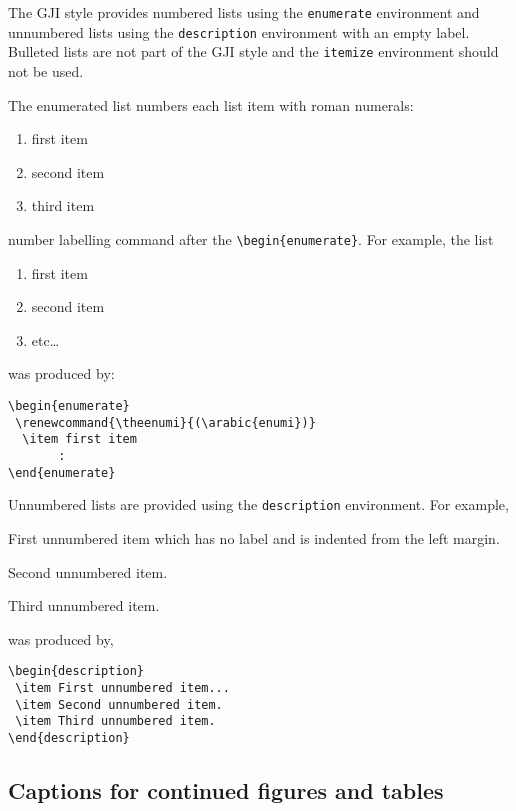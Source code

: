 The GJI style provides numbered lists using the \verb"enumerate" environment and
unnumbered lists using the \verb"description" environment with an empty label.
Bulleted lists are not part of the GJI style and the \verb"itemize" environment
should not be used.

The enumerated list numbers each list item with roman numerals:
\begin{enumerate}
  \item first item
  \item second item
  \item third item
\end{enumerate}
number labelling command after the \verb"\begin{enumerate}". For example, the
list
\begin{enumerate}
\renewcommand{\theenumi}{(\arabic{enumi})}
  \item first item
  \item second item
  \item etc\ldots
\end{enumerate}
was produced by:
\begin{verbatim}
\begin{enumerate}
 \renewcommand{\theenumi}{(\arabic{enumi})}
  \item first item
       :
\end{enumerate}
\end{verbatim}
Unnumbered lists are provided using the \verb"description" environment. For
example,
\begin{description}
  \item First unnumbered item which has no label and is indented from the left
        margin.
  \item Second unnumbered item.
  \item Third unnumbered item.
\end{description}
was produced by,
\begin{verbatim}
\begin{description}
 \item First unnumbered item...
 \item Second unnumbered item.
 \item Third unnumbered item.
\end{description}
\end{verbatim}

\subsection{Captions for continued figures and tables}

